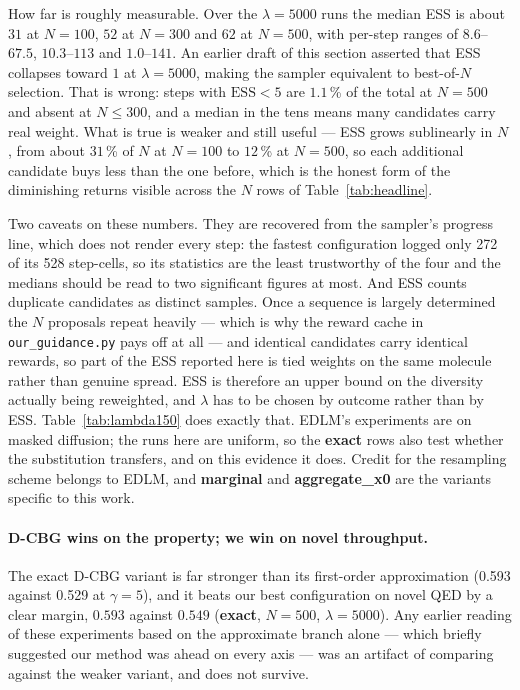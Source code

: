 \documentclass[11pt]{article}
\begin{document}
How far is roughly measurable. Over the $\lambda = 5000$ runs the median ESS is
about $31$ at $N = 100$, $52$ at $N = 300$ and $62$ at $N = 500$, with per-step
ranges of $8.6$--$67.5$, $10.3$--$113$ and $1.0$--$141$. An earlier draft of this
section asserted that ESS collapses toward $1$ at $\lambda = 5000$, making the
sampler equivalent to best-of-$N$ selection. That is wrong: steps with
$\mathrm{ESS} < 5$ are $1.1$\,\% of the total at $N = 500$ and absent at
$N \le 300$, and a median in the tens means many candidates carry real weight.
What is true is weaker and still useful --- ESS grows sublinearly in $N$, from
about $31$\,\% of $N$ at $N = 100$ to $12$\,\% at $N = 500$, so each additional
candidate buys less than the one before, which is the honest form of the
diminishing returns visible across the $N$ rows of Table~\ref{tab:headline}.

Two caveats on these numbers. They are recovered from the sampler's progress
line, which does not render every step: the fastest configuration logged only 272
of its 528 step-cells, so its statistics are the least trustworthy of the four
and the medians should be read to two significant figures at most. And ESS counts
duplicate candidates as distinct samples. Once a sequence is largely determined
the $N$ proposals repeat heavily --- which is why the reward cache in
\texttt{our\_guidance.py} pays off at all --- and identical candidates carry
identical rewards, so part of the ESS reported here is tied weights on the same
molecule rather than genuine spread. ESS is therefore an upper bound on the
diversity actually being reweighted, and $\lambda$ has to be chosen by outcome
rather than by ESS. Table~\ref{tab:lambda150} does exactly that.
EDLM's experiments are on masked diffusion; the runs here are uniform, so the
\textbf{exact} rows also test whether the substitution transfers, and on this
evidence it does. Credit for the resampling scheme belongs to EDLM, and
\textbf{marginal} and \textbf{aggregate\_x0} are the variants specific to this
work.

\paragraph{D-CBG wins on the property; we win on novel throughput.}
The exact D-CBG variant is far stronger than its first-order approximation
(0.593 against 0.529 at $\gamma = 5$), and it beats our best configuration on
novel QED by a clear margin, $0.593$ against $0.549$ (\textbf{exact},
$N{=}500$, $\lambda{=}5000$). Any earlier reading of
these experiments based on the approximate branch alone --- which briefly
suggested our method was ahead on every axis --- was an artifact of comparing
against the weaker variant, and does not survive.
\end{document}
